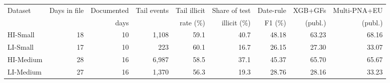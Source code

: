 \begin{tabular}{lrrrrrrrr}
\toprule
Dataset & Days in file & Documented & Tail events & Tail illicit & Share of test & Date-rule & XGB+GFs & Multi-PNA+EU \\
 & & days & & rate (\%) & illicit (\%) & F1 (\%) & (publ.) & (publ.) \\
\midrule
HI-Small & 18 & 10 & 1,108 & 59.1 & 40.7 & 48.18 & 63.23 & 68.16 \\
LI-Small & 17 & 10 & 223 & 60.1 & 16.7 & 26.15 & 27.30 & 33.07 \\
HI-Medium & 28 & 16 & 6,987 & 58.5 & 37.1 & 45.37 & 65.70 & 65.67 \\
LI-Medium & 27 & 16 & 1,370 & 56.3 & 19.3 & 28.76 & 28.16 & 33.23 \\
\bottomrule
\end{tabular}